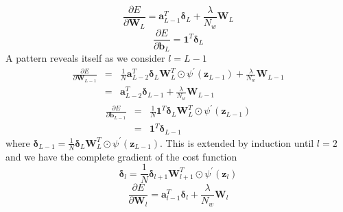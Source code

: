 \begin{equation*}
\frac{\partial E}{\partial \textbf{W}_L} = 
\textbf{a}^T_{L - 1}\boldsymbol{\delta}_{L} + \frac{\lambda}{N_w}\textbf{W}_L
\end{equation*}
\begin{equation*}
\frac{\partial E}{\partial \textbf{b}_L} = 
\textbf{1}^T\boldsymbol{\delta}_{L}
\end{equation*}
A pattern reveals itself as we consider $l=L-1$
\begin{eqnarray*}
\frac{\partial E}{\partial \textbf{W}_{L - 1}} & = & 
\frac{1}{N} \textbf{a}^T_{L - 2}
\boldsymbol{\delta}_L \textbf{W}^T_L \odot
\psi^{\prime}(\textbf{z}_{L - 1}) + \frac{\lambda}{N_w}\textbf{W}_{L - 1} \nonumber \\
& = & \textbf{a}^T_{L - 2}
\boldsymbol{\delta}_{L - 1} + \frac{\lambda}{N_w}\textbf{W}_{L - 1}
\end{eqnarray*}
\begin{eqnarray*}
\frac{\partial E}{\partial \textbf{b}_{L - 1}} & = & 
\frac{1}{N} \textbf{1}^T
\boldsymbol{\delta}_L \textbf{W}^T_L \odot
\psi^{\prime}(\textbf{z}_{L - 1}) \nonumber \\
& = & \textbf{1}^T
\boldsymbol{\delta}_{L - 1}
\end{eqnarray*}
where $\boldsymbol{\delta}_{L - 1} = \frac{1}{N} \boldsymbol{\delta}_L \textbf{W}^T_L \odot \psi^{\prime}(\textbf{z}_{L - 1})$. This is extended by induction until $l = 2$ and we have the complete gradient of the cost function
\begin{equation}
\boldsymbol{\delta}_{l} = \frac{1}{N} \boldsymbol{\delta}_{l + 1} \textbf{W}^T_{l + 1} \odot \psi^{\prime}(\textbf{z}_{l})
\end{equation}
\begin{equation}
\frac{\partial E}{\partial \textbf{W}_{l}} = 
\textbf{a}^T_{l - 1}
\boldsymbol{\delta}_{l} + \frac{\lambda}{N_w}\textbf{W}_{l}
\end{equation}
